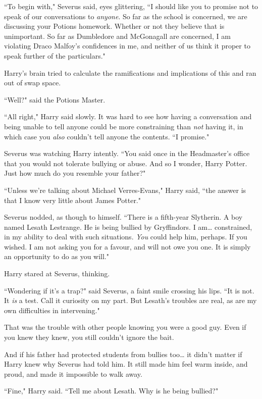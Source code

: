 ``To begin with," Severus said, eyes glittering, ``I should like you to promise not to speak of our conversations to \emph{anyone}. So far as the school is concerned, we are discussing your Potions homework. Whether or not they believe that is unimportant. So far as Dumbledore and McGonagall are concerned, I am violating Draco Malfoy's confidences in me, and neither of us think it proper to speak further of the particulars."

Harry's brain tried to calculate the ramifications and implications of this and ran out of swap space.

``Well?" said the Potions Master.

``All right," Harry said slowly. It was hard to see how having a conversation and being unable to tell anyone could be more constraining than \emph{not} having it, in which case you \emph{also} couldn't tell anyone the contents. ``I promise."

Severus was watching Harry intently. ``You said once in the Headmaster's office that you would not tolerate bullying or abuse. And so I wonder, Harry Potter. Just how much do you resemble your father?"

``Unless we're talking about Michael Verres-Evans," Harry said, ``the answer is that I know very little about James Potter."

Severus nodded, as though to himself. ``There is a fifth-year Slytherin. A boy named Lesath Lestrange. He is being bullied by Gryffindors. I am{\ldots} constrained, in my ability to deal with such situations. \emph{You} could help him, perhaps. If you wished. I am not asking you for a favour, and will not owe you one. It is simply an opportunity to do as you will."

Harry stared at Severus, thinking.

``Wondering if it's a trap?" said Severus, a faint smile crossing his lips. ``It is not. It \emph{is} a test. Call it curiosity on my part. But Lesath's troubles are real, as are my own difficulties in intervening."

That was the trouble with other people knowing you were a good guy. Even if you knew they knew, you still couldn't ignore the bait.

And if his father had protected students from bullies too{\ldots} it didn't matter if Harry knew why Severus had told him. It still made him feel warm inside, and proud, and made it impossible to walk away.

``Fine," Harry said. ``Tell me about Lesath. Why is he being bullied?"

